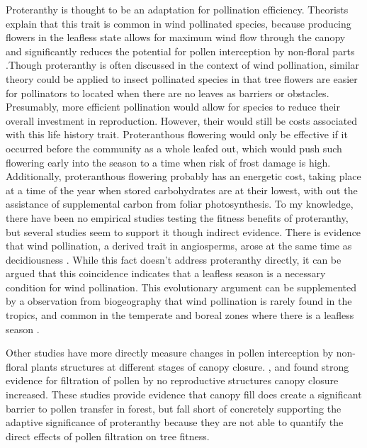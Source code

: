 \documentclass{article}\usepackage[]{graphicx}\usepackage[]{color}
\begin{document}
\par Proteranthy is thought to be an adaptation for pollination efficiency. Theorists explain that this trait is common in wind pollinated species, because producing flowers in the leafless state allows for maximum wind flow through the canopy and significantly reduces the potential for pollen interception by non-floral parts \citep{Rathcke1985, Whitehead1969}.Though proteranthy is often discussed in the context of wind pollination, similar theory could be applied to insect pollinated species in that tree flowers are easier for pollinators to located when there are no leaves as barriers or obstacles. Presumably, more efficient pollination would allow for species to reduce their overall investment in reproduction. However, their would still be costs associated with this life history trait. Proteranthous flowering would only be effective if it occurred before the community as a whole leafed out, which would push such flowering early into the season to a time when risk of frost damage is high. Additionally, proteranthous flowering probably has an energetic cost, taking place at a time of the year when stored carbohydrates are at their lowest, with out the assistance of supplemental carbon from foliar photosynthesis\citep{Aschan2003}.
To my knowledge, there have been no empirical studies testing the fitness benefits of proteranthy, but several studies seem to support it though indirect evidence. There is evidence that wind pollination, a derived trait in angiosperms, arose at the same time as decidiousness \citep{Whitehead1969}. While this fact doesn't address proteranthy directly, it can be argued that this coincidence indicates that a leafless season is a necessary condition for wind pollination. This evolutionary argument can be supplemented by a observation from biogeography that wind pollination is rarely found in the tropics, and common in the temperate and boreal zones where there is a leafless season \citep{Whitehead1969}.
\par Other studies have more directly measure changes in pollen interception by non-floral plants structures at different stages of canopy closure. \citep {Tauber1967, Milleron2012}, and found strong evidence for filtration of pollen by no reproductive structures canopy closure increased. These studies provide evidence that canopy fill does create a significant barrier to pollen transfer in forest, but fall short of concretely supporting the adaptive significance of proteranthy because they are not able to quantify the direct effects of pollen filtration on tree fitness.
\end{document}
